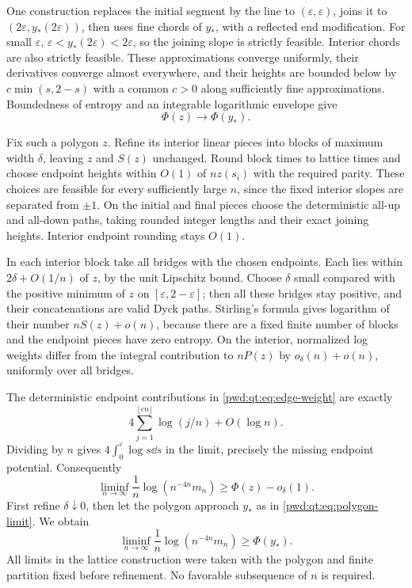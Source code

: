 \documentclass[11pt,letterpaper]{article}
\numberwithin{equation}{section}
\theoremstyle{remark}\newtheorem{remark}[theorem]{Remark}
\begin{document}
One construction replaces the initial segment by the line to $(\varepsilon,\varepsilon)$, joins it to $(2\varepsilon,y_*(2\varepsilon))$, then uses fine chords of $y_*$, with a reflected end modification. For small $\varepsilon$,
$\varepsilon<y_*(2\varepsilon)<2\varepsilon$, so the joining slope is strictly feasible. Interior chords are also strictly feasible. These approximations converge uniformly, their derivatives converge almost everywhere, and their heights are bounded below by $c\min(s,2-s)$ with a common $c>0$ along sufficiently fine approximations. Boundedness of entropy and an integrable logarithmic envelope give
\begin{equation}\label{pwd:qt:eq:polygon-limit}
 \Phi(z)\longrightarrow\Phi(y_*).
\end{equation}

Fix such a polygon $z$. Refine its interior linear pieces into blocks of maximum width $\delta$, leaving $z$ and $S(z)$ unchanged. Round block times to lattice times and choose endpoint heights within $O(1)$ of $nz(s_i)$ with the required parity. These choices are feasible for every sufficiently large $n$, since the fixed interior slopes are separated from $\pm1$. On the initial and final pieces choose the deterministic all-up and all-down paths, taking rounded integer lengths and their exact joining heights. Interior endpoint rounding stays $O(1)$.

In each interior block take all bridges with the chosen endpoints. Each lies within $2\delta+O(1/n)$ of $z$, by the unit Lipschitz bound. Choose $\delta$ small compared with the positive minimum of $z$ on $[\varepsilon,2-\varepsilon]$; then all these bridges stay positive, and their concatenations are valid Dyck paths. Stirling's formula gives logarithm of their number
$nS(z)+o(n)$, because there are a fixed finite number of blocks and the endpoint pieces have zero entropy. On the interior, normalized log weights differ from the integral contribution to $nP(z)$ by $o_\delta(n)+o(n)$, uniformly over all bridges.

The deterministic endpoint contributions in \eqref{pwd:qt:eq:edge-weight} are exactly
\[
 4\sum_{j=1}^{\lfloor\varepsilon n\rfloor}\log(j/n)+O(\log n).
\]
Dividing by $n$ gives $4\int_0^\varepsilon\log s\dd s$ in the limit, precisely the missing endpoint potential. Consequently
\[
 \liminf_{n\to\infty}\frac1n\log(n^{-4n}m_n)
 \ge\Phi(z)-o_\delta(1).
\]
First refine $\delta\downarrow0$, then let the polygon approach $y_*$ as in \eqref{pwd:qt:eq:polygon-limit}. We obtain
\begin{equation}\label{pwd:qt:eq:lower}
 \liminf_{n\to\infty}\frac1n\log(n^{-4n}m_n)\ge\Phi(y_*).
\end{equation}
All limits in the lattice construction were taken with the polygon and finite partition fixed before refinement. No favorable subsequence of $n$ is required.
\end{document}
